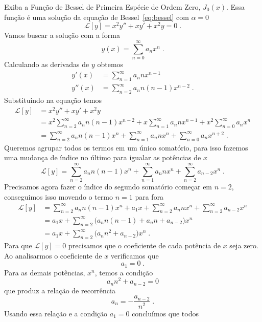 \begin{example}
  Exiba a Função de Bessel de Primeira Espécie de Ordem Zero, $J_0(x)$.
  \solution
  Essa função é uma solução da equação de Bessel~\eqref{eq:bessel} com
  $\alpha=0$
  \[
  \mathcal{L}[y] = x^2 y'' + xy' + x^2y = 0 \;.
  \]
  Vamos buscar a solução com a forma
  \[
  y(x) = \sum_{n=0}^\infty a_n x^n \;.
  \]
  Calculando as derivadas de $y$ obtemos
  \begin{align*}
    y'(x)  & = \sum_{n=1}^\infty a_n n x^{n-1} \\[3mm]
    y''(x) & = \sum_{n=2}^\infty a_n n(n-1) x^{n-2} \;.
  \end{align*}
  Substituindo na equação temos
  \begin{align*}
    \mathcal{L}[y] & = x^2 y'' + xy' + x^2y \\[3mm]
    & = x^2 \sum_{n=2}^\infty a_n n(n-1) x^{n-2}
    + x   \sum_{n=1}^\infty a_n n x^{n-1}
    + x^2 \sum_{n=0}^\infty a_n x^n
    \\[3mm]
    & = \sum_{n=2}^\infty a_n n (n-1) x^n
    + \sum_{n=1}^\infty a_n n       x^n
    + \sum_{n=0}^\infty a_n         x^{n+2} \;.
  \end{align*}
  Queremos agrupar todos os termos em um único somatório,
  para isso fazemos uma mudança de índice no último
  para igualar as potências de $x$
  \[
  \mathcal{L}[y] = \sum_{n=2}^\infty a_n n (n-1) x^n
  + \sum_{n=1}^\infty a_n n       x^n
  + \sum_{n=2}^\infty a_{n-2}     x^n \;.
  \]
  Precisamos agora fazer o índice do segundo somatório começar em $n=2$,
  conseguimos isso movendo o termo $n=1$ para fora
  \begin{align*}
    \mathcal{L}[y] & =        \sum_{n=2}^\infty a_n n (n-1) x^n
    + a_1x + \sum_{n=2}^\infty a_n n       x^n
    +        \sum_{n=2}^\infty a_{n-2}     x^n \\[3mm]
    & = a_1x + \sum_{n=2}^\infty \big( a_n n (n-1) + a_n n + a_{n-2} \big) x^n \\[3mm]
    & = a_1x + \sum_{n=2}^\infty \big( a_n n^2 + a_{n-2} \big) x^n \;.
  \end{align*}
  Para que
  \(
  \mathcal{L}[y] = 0
  \)
  precisamos que o coeficiente
  de cada potência de $x$ seja zero. Ao analisarmos o
  coeficiente de $x$ verificamos que
  \[
  a_1 = 0 \;.
  \]
  Para as demais potências, $x^n$, temos a condição
  \[
  a_n n^2 + a_{n-2} = 0
  \]
  que produz a relação de recorrência
  \[
  a_n = -\frac{a_{n-2}}{n^2} \;.
  \]
  Usando essa relação e a condição $a_1 = 0$ concluímos que todos

\end{example}

